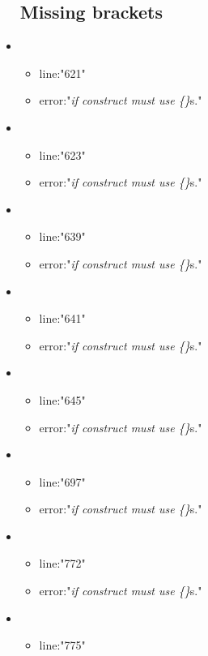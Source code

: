 \begin{itemize}
\subsection{Missing brackets} %
\label{sub:missing_brackets}

	\item 
	\begin{itemize} 
		\item line:"621" 
		\item error:"\emph{if construct must use \{\}}s." 
	\end{itemize}
	\item 
	\begin{itemize} 
		\item line:"623" 
		\item error:"\emph{if construct must use \{\}}s." 
	\end{itemize}
	\item 
	\begin{itemize} 
		\item line:"639" 
		\item error:"\emph{if construct must use \{\}}s." 
	\end{itemize}
	\item 
	\begin{itemize} 
		\item line:"641" 
		\item error:"\emph{if construct must use \{\}}s." 
	\end{itemize}
	\item 
	\begin{itemize} 
		\item line:"645" 
		\item error:"\emph{if construct must use \{\}}s." 
	\end{itemize}
	\item 
	\begin{itemize} 
		\item line:"697" 
		\item error:"\emph{if construct must use \{\}}s." 
	\end{itemize}
	\item 
	\begin{itemize} 
		\item line:"772" 
		\item error:"\emph{if construct must use \{\}}s." 
	\end{itemize}
	\item 
	\begin{itemize} 
		\item line:"775" 

\end{itemize}
\end{itemize}
